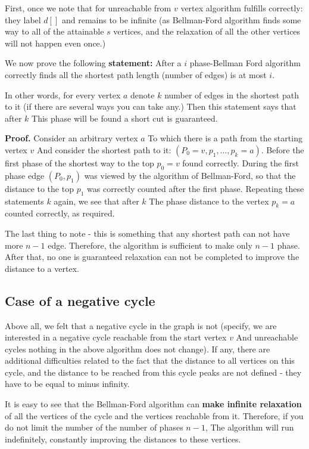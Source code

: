 First, once we note that for unreachable from $v$ vertex algorithm fulfills correctly: they label $d []$ and remains to be infinite (as Bellman-Ford algorithm finds some way to all of the attainable $s$ vertices, and the relaxation of all the other vertices will not happen even once.)

We now prove the following \textbf{statement:} After a $i$ phase-Bellman Ford algorithm correctly finds all the shortest path length (number of edges) is at most $i$.

In other words, for every vertex $a$ denote $k$ number of edges in the shortest path to it (if there are several ways you can take any.) Then this statement says that after $k$ This phase will be found a short cut is guaranteed.

\textbf{Proof.} Consider an arbitrary vertex $a$ To which there is a path from the starting vertex $v$ And consider the shortest path to it: $(P_0 = v, p_1, \ldots, p_k = a)$. Before the first phase of the shortest way to the top $p_0 = v$ found correctly. During the first phase edge $(P_0, p_1)$ was viewed by the algorithm of Bellman-Ford, so that the distance to the top $p_1$ was correctly counted after the first phase. Repeating these statements $k$ again, we see that after $k$ The phase distance to the vertex $p_k = a$ counted correctly, as required.

The last thing to note - this is something that any shortest path can not have more $n-1$ edge. Therefore, the algorithm is sufficient to make only $n-1$ phase. After that, no one is guaranteed relaxation can not be completed to improve the distance to a vertex.

\subsection{ Case of a negative cycle }

Above all, we felt that a negative cycle in the graph is not (specify, we are interested in a negative cycle reachable from the start vertex $v$ And unreachable cycles nothing in the above algorithm does not change). If any, there are additional difficulties related to the fact that the distance to all vertices on this cycle, and the distance to be reached from this cycle peaks are not defined - they have to be equal to minus infinity.

It is easy to see that the Bellman-Ford algorithm can \textbf{make infinite relaxation} of all the vertices of the cycle and the vertices reachable from it. Therefore, if you do not limit the number of the number of phases $n-1$, The algorithm will run indefinitely, constantly improving the distances to these vertices.

